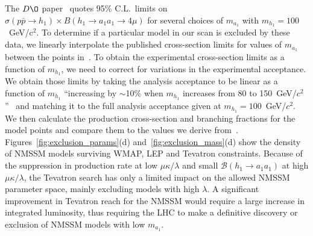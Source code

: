 \documentclass[aps,prl,twocolumn,nofootinbib,superscriptaddress]{revtex4}
\begin{document}
The $D\O$ paper~\cite{d0-low-ma} quotes 95\% C.L.\ limits on
$\sigma(p\bar{p} \to h_1) \times B(h_1 \to a_1 a_1 \to 4\mu)$ for
several choices of $m_{a_1}$ with $m_{h_1} = 100$~GeV/c$^2$.  To
determine if a particular model in our scan is excluded by these data,
we linearly interpolate the published cross-section limits for values
of $m_{a_1}$ between the points in~\cite{d0-low-ma}.  To obtain the
experimental cross-section limits as a function of $m_{h_1}$, we need
to correct for variations in the experimental acceptance.  We obtain
those limits by taking the analysis acceptance to be linear as a
function of $m_{h_1}$ ``increasing by $\sim$10\% when $m_{h_1}$
increases from 80 to 150~GeV/$c^2$''~\cite{d0-low-ma} and matching it
to the full analysis acceptance given at $m_{h_1} = 100$~GeV/$c^2$.
We then calculate the production cross-section and branching fractions
for the model points and compare them to the values we derive
from~\cite{d0-low-ma}.  Figures~\ref{fig:exclusion_params}(d)
and~\ref{fig:exclusion_mass}(d) show the density of NMSSM models
surviving WMAP, LEP and Tevatron constraints.  Because of the
suppression in production rate at low $\mu\kappa/\lambda$ and small
$\mathcal{B}(h_1 \to a_1 a_1)$ at high $\mu\kappa/\lambda$, the
Tevatron search has only a limited impact on the allowed NMSSM
parameter space, mainly excluding models with high $\lambda$.  A
significant improvement in Tevatron reach for the NMSSM would require
a large increase in integrated luminosity, thus requiring the LHC to
make a definitive discovery or exclusion of NMSSM models with low
$m_{a_1}$.


\end{document}
